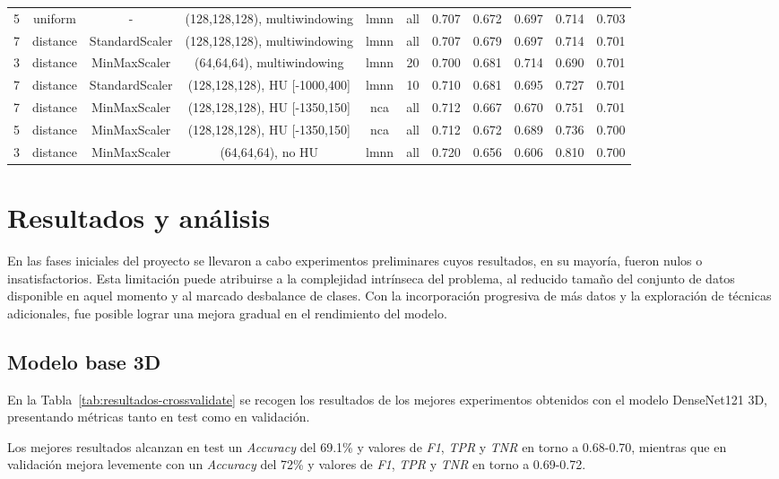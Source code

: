 \begin{sidewaystable}[!htbp]
{\begin{tabular}{ccccccccccc}
5 & uniform & - & (128,128,128), multiwindowing & lmnn & all & 0.707 & 0.672 & 0.697 & 0.714 & 0.703 \\
7 & distance & StandardScaler & (128,128,128), multiwindowing & lmnn & all & 0.707 & 0.679 & 0.697 & 0.714 & 0.701 \\
3 & distance & MinMaxScaler & (64,64,64), multiwindowing & lmnn & 20 & 0.700 & 0.681 & 0.714 & 0.690 & 0.701 \\
7 & distance & StandardScaler & (128,128,128), HU [-1000,400] & lmnn & 10 & 0.710 & 0.681 & 0.695 & 0.727 & 0.701 \\
7 & distance & MinMaxScaler & (128,128,128), HU [-1350,150] & nca & all & 0.712 & 0.667 & 0.670 & 0.751 & 0.701 \\
5 & distance & MinMaxScaler & (128,128,128), HU [-1350,150] & nca & all & 0.712 & 0.672 & 0.689 & 0.736 & 0.700 \\
3 & distance & MinMaxScaler & (64,64,64), no HU & lmnn & all & 0.720 & 0.656 & 0.606 & 0.810 & 0.700 \\
\bottomrule
\end{tabular}%
}
\end{sidewaystable}



\section{Resultados y análisis} \label{sec:resultados}
En las fases iniciales del proyecto se llevaron a cabo experimentos preliminares cuyos resultados, en su mayoría, fueron nulos o insatisfactorios. Esta limitación puede atribuirse a la complejidad intrínseca del problema, al reducido tamaño del conjunto de datos disponible en aquel momento y al marcado desbalance de clases. Con la incorporación progresiva de más datos y la exploración de técnicas adicionales, fue posible lograr una mejora gradual en el rendimiento del modelo.

\subsection{Modelo base 3D}
En la Tabla~\ref{tab:resultados-crossvalidate} se recogen los resultados de los mejores experimentos obtenidos con el modelo DenseNet121 3D, presentando métricas tanto en test como en validación.

Los mejores resultados alcanzan en test un \textit{Accuracy} del 69.1\% y valores de \textit{F1}, \textit{TPR} y \textit{TNR} en torno a 0.68-0.70, mientras que en validación mejora levemente con un \textit{Accuracy} del 72\% y valores de \textit{F1}, \textit{TPR} y \textit{TNR} en torno a 0.69-0.72.

